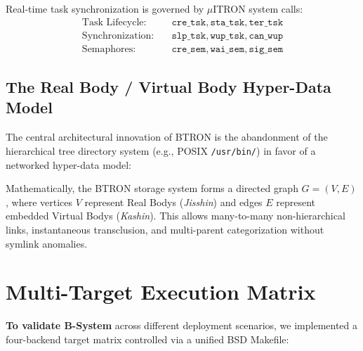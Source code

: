 \documentclass[10pt,journal,compsoc,twocolumn]{article}
\newcommand{\ja}[1]{\begin{CJK*}{UTF8}{min}#1\end{CJK*}}
\begin{document}
Real-time task synchronization is governed by $\mu$ITRON system calls:
\begin{align}
\text{Task Lifecycle:} \quad & \texttt{cre\_tsk}, \texttt{sta\_tsk}, \texttt{ter\_tsk} \\
\text{Synchronization:} \quad & \texttt{slp\_tsk}, \texttt{wup\_tsk}, \texttt{can\_wup} \\
\text{Semaphores:} \quad & \texttt{cre\_sem}, \texttt{wai\_sem}, \texttt{sig\_sem}
\end{align}

\subsection{The Real Body / Virtual Body Hyper-Data Model}
The central architectural innovation of BTRON is the abandonment of the hierarchical tree directory system (e.g., POSIX \texttt{/usr/bin/}) in favor of a networked hyper-data model:


Mathematically, the BTRON storage system forms a directed graph $G = (V, E)$, where vertices $V$ represent Real Bodys (\emph{Jisshin}) and edges $E$ represent embedded Virtual Bodys (\emph{Kashin}). This allows many-to-many non-hierarchical links, instantaneous transclusion, and multi-parent categorization without symlink anomalies.

\section{Multi-Target Execution Matrix}
\label{sec:execution_matrix}

\textbf{To validate B-System} across different deployment scenarios, we implemented a four-backend target matrix controlled via a unified BSD Makefile:
\end{document}

